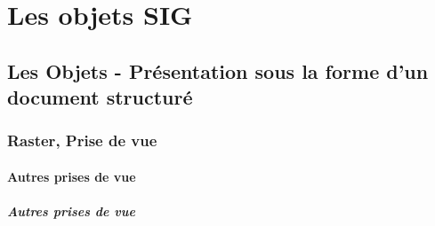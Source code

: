 \documentclass[12pt,titlepage,oneside]{book}
\begin{document}
\chapter{Les objets SIG}



\section{Les Objets - Présentation sous la forme d'un document structuré}

\vspace{\baselineskip}


\subsection{Raster, Prise de vue}
\subsubsection{\large Autres prises de vue}
\paragraph{Autres prises de vue}
\noindent
\vspace{\baselineskip}
\end{document}
